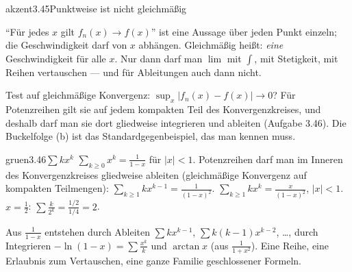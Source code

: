 \begin{loesungkarte}{akzent}{3.45}{Punktweise ist nicht gleichmäßig}
\begin{fehler}\kastentext
\enquote{Für jedes $x$ gilt $f_n(x)\to f(x)$} ist eine Aussage über jeden Punkt einzeln; die Geschwindigkeit darf von $x$ abhängen. Gleichmäßig heißt: \emph{eine} Geschwindigkeit für alle $x$. Nur dann darf man $\lim$ mit $\int$, mit Stetigkeit, mit Reihen vertauschen --- und für Ableitungen auch dann nicht.
\end{fehler}
\begin{mitnehmen}\kastentext
Test auf gleichmäßige Konvergenz: $\sup_x|f_n(x) - f(x)|\to0$? Für Potenzreihen gilt sie auf jedem kompakten Teil des Konvergenzkreises, und deshalb darf man sie dort gliedweise integrieren und ableiten (Aufgabe 3.46). Die Buckelfolge (b) ist das Standardgegenbeispiel, das man kennen muss.
\end{mitnehmen}
\end{loesungkarte}

\begin{loesungkarte}{gruen}{3.46}{$\sum kx^{k}$}
$\sum_{k\ge0}x^{k} = \frac1{1 - x}$ für $|x| < 1$. Potenzreihen darf man im Inneren des Konvergenzkreises gliedweise ableiten (gleichmäßige Konvergenz auf kompakten Teilmengen): $\sum_{k\ge1}kx^{k-1} = \frac1{(1 - x)^{2}}$.
$\sum_{k\ge1}kx^{k} = \frac x{(1 - x)^{2}}$, $|x| < 1$.
$x = \frac12$: $\sum\frac k{2^{k}} = \frac{1/2}{1/4} = 2$.
\begin{mitnehmen}\kastentext
Aus $\frac1{1 - x}$ entstehen durch Ableiten $\sum kx^{k-1}$, $\sum k(k - 1)x^{k-2}$, \dots, durch Integrieren $-\ln(1 - x) = \sum\frac{x^{k}}k$ und $\arctan x$ (aus $\frac1{1 + x^{2}}$). Eine Reihe, eine Erlaubnis zum Vertauschen, eine ganze Familie geschlossener Formeln.
\end{mitnehmen}
\end{loesungkarte}

